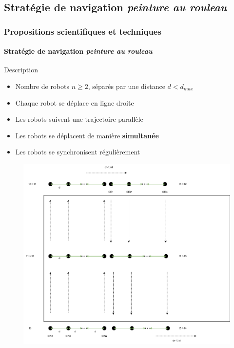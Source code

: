 \documentclass{beamer}
\newcommand{\compresslist}{\setlength{\itemsep}{0pt}\setlength{\parskip}{1pt}\setlength{\parsep}{0pt}}
\begin{document}
		\subsection{Stratégie de navigation \textit{peinture au rouleau}}
			\begin{frame}
				\frametitle{Propositions scientifiques et techniques}
				\framesubtitle{Stratégie de navigation \textit{peinture au rouleau}}
				\vspace{-5pt}
				\tiny
				\begin{block}{Description}
					\begin{itemize}\compresslist
						\item Nombre de robots $n \ge 2$, séparés par une distance $d < d_{max}$
						\item Chaque robot se déplace en ligne droite
						\item Les robots suivent une trajectoire parallèle
						\item Les robots se déplacent de manière \textbf{simultanée}
						\item Les robots se synchronisent régulièrement
					\end{itemize}
				\end{block}
				\vspace{-5pt}
				\begin{figure}
					\centering
					\includegraphics[width=0.5\linewidth]{graphics/peinture_au_rouleau.png}
				\end{figure}
			\end{frame}
\end{document}
